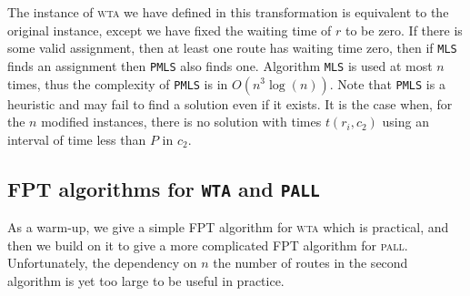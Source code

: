 \documentclass[a4paper,10pt]{journal}
\newcommand\MLS{\texttt{MLS}\xspace}
\newcommand\PMLS{\texttt{PMLS}\xspace}
\newcommand\pall{\textsc{pall}\xspace}
\newcommand\wta{\textsc{wta}\xspace}
\begin{document}
     The instance of \wta we have defined in this transformation is equivalent 
     to the original instance, except we have fixed the waiting time of 
     $r$ to be zero. If there is some valid assignment, then at least one route has waiting time zero, then if \MLS finds an assignment then \PMLS also finds one. Algorithm \MLS is used at most $n$ times, thus the complexity of \PMLS is in $O(n^3\log(n))$. Note that \PMLS is a heuristic and may fail to find a solution even if it exists. It is the case when, for the $n$ modified instances, there is no solution with times $t(r_i,c_2)$ using an interval of time less than $P$ in $c_2$. 



%   
%     
% 
%     
% 
% 

\subsection{FPT algorithms for \texttt{WTA} and \texttt{PALL}}

As a warm-up, we give a simple FPT algorithm for \wta which is practical,
and then we build on it to give a more complicated FPT algorithm for \pall. Unfortunately, the dependency on $n$ the number of routes in the second algorithm is yet too large to be useful in practice. 
\end{document}
